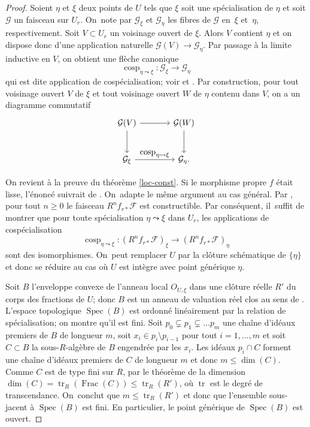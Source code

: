 \documentclass[11pt]{article}
\let\ts\textstyle
\theoremstyle{definition}
\newcommand{\mc}[1]{\mathcal{#1}}
\newcommand{\on}[1]{\operatorname{#1}}
\begin{document}
\begin{proof}
Soient $\eta$ et $\xi$ deux points de $U$ tels que $\xi$ soit une spécialisation de $\eta$ et soit $\mc{G}$ un faisceau sur $U_r$. On~note par $\mc{G}_{\xi}$ et $\mc{G}_{\eta}$ les fibres de $\mc{G}$ en~$\xi$ et~$\eta$, respectivement. Soit $V\subset U_r$ un voisinage ouvert de $\xi$. Alors $V$ contient $\eta$ et on dispose donc d'une application naturelle $\mc{G}(V)\to \mc{G}_\eta$. Par passage à la limite inductive en $V$, on obtient une flèche canonique
\[\on{cosp}_{\eta\leadsto\xi}\colon \mc{G}_{\xi} \to \mc{G}_{\eta}\]
qui est dite application de cospécialisation; voir \cite[(5) p.\,203]{scheiderer1994real} et \cite[Ch.\,VIII, 7.7]{sga4II}. Par construction, pour tout voisinage ouvert $V$ de $\xi$ et tout voisinage ouvert $W$ de $\eta$ contenu dans $V$, on a un diagramme commutatif
\begin{equation}
\begin{tikzcd}[column sep = large,row sep = large]\label{cosp-square}
\mc{G}(V) \arrow[r] \arrow[d] & \mc{G}(W) \arrow[d] \\
\mc{G}_\xi \arrow[r,"\ts\on{cosp}_{\eta\leadsto\xi}"] & \mc{G}_\eta.
\end{tikzcd}
\end{equation}

On revient à la preuve du théorème \ref{loc-const}. Si le morphisme propre $f$ était lisse, l'énoncé suivrait de \cite[Cor.\,17.20(a)]{scheiderer1994real}. On~adapte le même argument au cas général. Par \cite[Th.\,17.7]{scheiderer1994real}, pour tout $n\geq 0$ le faisceau $R^n f_{r*} \mc{F}$ est constructible. Par conséquent, il~suffit de montrer que pour toute spécialisation $\eta \leadsto \xi$ dans $U_r$, les applications de cospécialisation\enlargethispage{-\baselineskip}
\[\on{cosp}_{\eta\leadsto\xi}\colon (R^n f_{r*} \mc{F})_{\xi} \to (R^n f_{r*} \mc{F})_{\eta}\] sont des isomorphismes. On~peut remplacer $U$ par la clôture schématique de $\{\eta\}$ et donc se réduire au cas où $U$ est intègre avec point générique $\eta$.

Soit $B$ l'enveloppe convexe de l'anneau local $O_{U,\xi}$ dans une clôture réelle $R'$ du corps des fractions de $U$; donc $B$ est un anneau de valuation réel clos au sens de \cite[(1.5)]{scheiderer1994real}. L'espace topologique $\on{Spec}(B)$ est ordonné linéairement par la relation de spécialisation; on montre qu'il est fini. Soit $p_0\subsetneq p_1\subsetneq\dots p_m$ une chaîne d’idéaux premiers de $B$ de longueur $m$, soit $x_i\in p_i\setminus p_{i-1}$ pour tout $i=1,\dots, m$ et soit $C\subset B$ la sous-$R$-algèbre de $B$ engendrée par les $x_i$. Les idéaux $p_i\cap C$ forment une chaîne d’idéaux premiers de $C$ de longueur $m$ et donc $m\leq \on{dim}(C)$. Comme $C$ est de type fini sur $R$, par le théorème de la dimension $\on{dim}(C)=\on{tr}_R(\on{Frac}(C))\leq \on{tr}_R(R')$, où $\on{tr}$ est le degré de transcendance. On~conclut que $m\leq \on{tr}_R(R')$ et donc que l'ensemble sous-jacent à $\on{Spec}(B)$ est fini. En particulier, le point générique de $\on{Spec}(B)$ est ouvert.


\end{proof}
\end{document}
